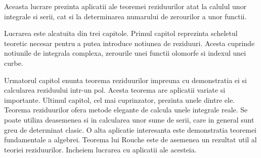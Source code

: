 Aceasta lucrare prezinta aplicatii ale teoremei reziduurilor atat la 
calulul unor integrale si serii, cat si la determinarea numarului 
de zerourilor a unor functii.

Lucrarea este alcatuita din trei capitole. Primul capitol reprezinta 
scheletul teoretic necesar pentru a putea introduce notiunea de reziduuri. 
Acesta cuprinde notiunile de integrala complexa, zerourile unei functii 
olomorfe si indexul unei curbe. 

Urmatorul capitol enunta teorema 
reziduurilor impreuna cu demonstratia ei si calcularea reziduului intr-un pol.
Acesta teorema are aplicatii variate si importante.
Ultimul capitol, cel mai cuprinzator, prezinta unele dintre ele.
Teorema reziduurilor ofera metode elegante de calcula unele integrale reale.
Se poate utiliza deasemenea si in calcularea unor sume de serii, care in 
general sunt greu de determinat clasic.
O alta aplicatie interesanta este demonstratia teoremei fundamentale a algebrei.
Teorema lui Rouche este de asemenea un rezultat util al teoriei reziduurilor. 
Incheiem lucrarea cu aplicatii ale acesteia.